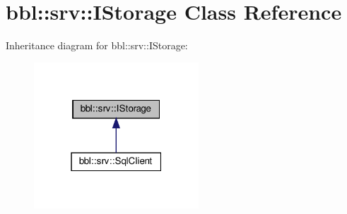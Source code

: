 \hypertarget{classbbl_1_1srv_1_1_i_storage}{}\section{bbl\+:\+:srv\+:\+:I\+Storage Class Reference}
\label{classbbl_1_1srv_1_1_i_storage}


Inheritance diagram for bbl\+:\+:srv\+:\+:I\+Storage\+:
\nopagebreak
\begin{figure}[H]
\begin{center}
\leavevmode
\includegraphics[width=175pt]{classbbl_1_1srv_1_1_i_storage__inherit__graph}
\end{center}
\end{figure}
